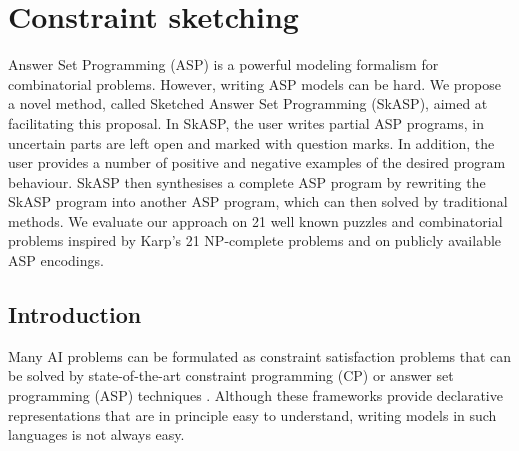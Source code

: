 \chapter{Constraint sketching} \label{ch:sketching}
Answer Set Programming (ASP) is a powerful modeling formalism for combinatorial problems. However, writing ASP models can be hard. We propose a novel method, called Sketched Answer Set Programming (SkASP), aimed at facilitating this proposal. In SkASP, the user writes partial ASP programs, in uncertain parts are left open and marked with question marks. In addition, the user provides a number of positive and negative examples of the desired program behaviour. SkASP then synthesises a complete ASP program by rewriting the SkASP program into another ASP program, which can then solved by traditional methods. We evaluate our approach on 21 well known puzzles and combinatorial problems inspired by Karp’s 21 NP-complete problems and on publicly available ASP encodings.

\newcommand{\addedsket}[1]{#1\xspace}

\section{Introduction}\label{sec:intro}
Many AI problems can be formulated as constraint satisfaction problems that can
be solved by state-of-the-art constraint programming (CP)  \cite{handbookcp} or answer set programming (ASP) techniques \cite{whatisasp}. 
Although these frameworks provide declarative representations that are in principle
easy to understand, writing models in such languages is not always easy.

